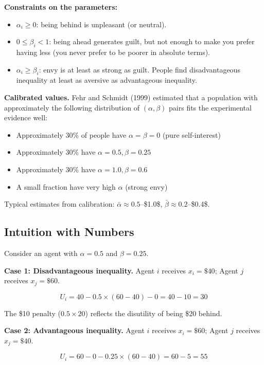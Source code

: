 \documentclass[12pt, letterpaper]{article}
\begin{document}
\textbf{Constraints on the parameters:}
\begin{itemize}
\item $\alpha_i \geq 0$: being behind is unpleasant (or neutral).

\item $0 \leq \beta_i < 1$: being ahead generates guilt, but not enough to make you prefer having less (you never prefer to be poorer in absolute terms).

\item $\alpha_i \geq \beta_i$: envy is at least as strong as guilt. People find disadvantageous inequality at least as aversive as advantageous inequality.
\end{itemize}

\textbf{Calibrated values.} Fehr and Schmidt (1999) estimated that a population with approximately the following distribution of $(\alpha, \beta)$ pairs fits the experimental evidence well:

\begin{itemize}
\item Approximately 30\% of people have $\alpha = \beta = 0$ (pure self-interest)
\item Approximately 30\% have $\alpha = 0.5, \beta = 0.25$
\item Approximately 30\% have $\alpha = 1.0, \beta = 0.6$
\item A small fraction have very high $\alpha$ (strong envy)
\end{itemize}

Typical estimates from calibration: $\bar{\alpha} \approx 0.5$--\$1.0\$, $\bar{\beta} \approx 0.2$--\$0.4\$.


\subsection{Intuition with Numbers}


Consider an agent with $\alpha = 0.5$ and $\beta = 0.25$.

\textbf{Case 1: Disadvantageous inequality.} Agent $i$ receives $x_i = \$40$; Agent $j$ receives $x_j = \$60$.

\[
U_i = 40 - 0.5 \times (60 - 40) - 0 = 40 - 10 = 30
\]

The \$10 penalty ($0.5 \times 20$) reflects the disutility of being \$20 behind.

\textbf{Case 2: Advantageous inequality.} Agent $i$ receives $x_i = \$60$; Agent $j$ receives $x_j = \$40$.

\[
U_i = 60 - 0 - 0.25 \times (60 - 40) = 60 - 5 = 55
\]
\end{document}
